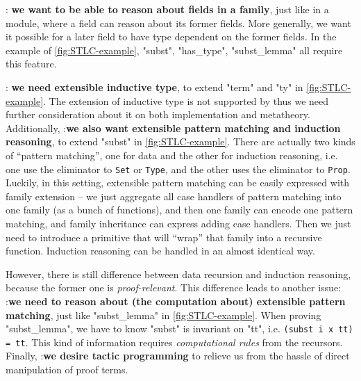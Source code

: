 :\textbf{ we want to be able to reason about fields in a family}, just like in a module, where a field can reason about its former fields. More generally, we want it possible for a later field to have type dependent on the former fields. In the example of \cref{fig:STLC-example}, "subst", "has_type", "subst_lemma" all require this feature.

:\textbf{ we need extensible inductive type}, to extend "term" and "ty" in \cref{fig:STLC-example}. The extension of inductive type is not supported by \citet{zm2017} thus we need further consideration about it on both implementation and metatheory. Additionally, :\textbf{we also want extensible pattern matching and induction reasoning}, to extend "subst" in \cref{fig:STLC-example}. There are actually two kinds of ``pattern matching'', one for data and the other for induction reasoning, i.e. one use the eliminator to \texttt{Set} or \texttt{Type}, and the other uses the eliminator to \texttt{Prop}. Luckily, in this setting, extensible pattern matching can be easily expressed with family extension -- we just aggregate all case handlers of pattern matching into one family (as a bunch of functions), and then one family can encode one pattern matching, and family inheritance can express adding case handlers. Then we just need to introduce a primitive that will ``wrap'' that family into a recursive function. Induction reasoning can be handled in an almost identical way. 

However, there is still difference between data recursion and induction reasoning, because the former one is \textit{proof-relevant}. This difference leads to another issue: :\textbf{we need to reason about (the computation about) extensible pattern matching}, just like "subst_lemma" in \cref{fig:STLC-example}. When proving "subst_lemma", we have to know "subst" is invariant on "tt", i.e. \texttt{(subst i x tt) = tt}. This kind of information requires \textit{computational rules} from the recursors.
Finally, :\textbf{we desire tactic programming} to relieve us from the hassle of direct manipulation of proof terms.


